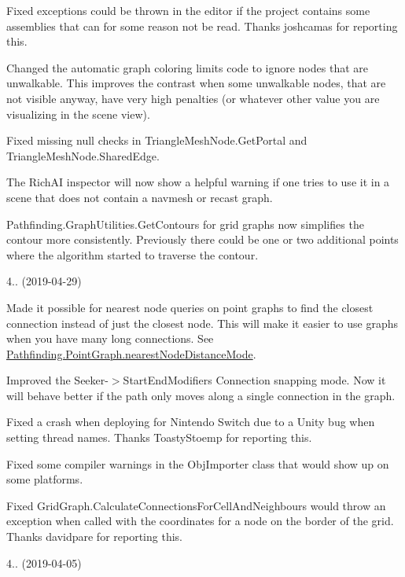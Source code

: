 \begin{DoxyItemize}
\begin{DoxyItemize}
\item Fixed exceptions could be thrown in the editor if the project contains some assemblies that can for some reason not be read. Thanks joshcamas for reporting this.
\item Changed the automatic graph coloring limits code to ignore nodes that are unwalkable. This improves the contrast when some unwalkable nodes, that are not visible anyway, have very high penalties (or whatever other value you are visualizing in the scene view).
\item Fixed missing null checks in Triangle\+Mesh\+Node.\+Get\+Portal and Triangle\+Mesh\+Node.\+Shared\+Edge.
\item The Rich\+AI inspector will now show a helpful warning if one tries to use it in a scene that does not contain a navmesh or recast graph.
\item Pathfinding.\+Graph\+Utilities.\+Get\+Contours for grid graphs now simplifies the contour more consistently. Previously there could be one or two additional points where the algorithm started to traverse the contour.
\end{DoxyItemize}
\item 4.. (2019-\/04-\/29)
\begin{DoxyItemize}
\item Made it possible for nearest node queries on point graphs to find the closest connection instead of just the closest node. This will make it easier to use graphs when you have many long connections. See \mbox{\hyperlink{class_pathfinding_1_1_point_graph_ad0862813b3ecd1396ab6aa65f49f3910}{Pathfinding.\+Point\+Graph.\+nearest\+Node\+Distance\+Mode}}.
\item Improved the Seeker-\/$>$Start\+End\+Modifier\textquotesingle{}s Connection snapping mode. Now it will behave better if the path only moves along a single connection in the graph.
\item Fixed a crash when deploying for Nintendo Switch due to a Unity bug when setting thread names. Thanks Toasty\+Stoemp for reporting this.
\item Fixed some compiler warnings in the Obj\+Importer class that would show up on some platforms.
\item Fixed Grid\+Graph.\+Calculate\+Connections\+For\+Cell\+And\+Neighbours would throw an exception when called with the coordinates for a node on the border of the grid. Thanks davidpare for reporting this.
\end{DoxyItemize}
\item 4.. (2019-\/04-\/05)

\end{DoxyItemize}
